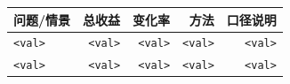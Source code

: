 \begin{tabular}{lrrrr}
\toprule
\textbf{问题/情景} & \textbf{总收益} & \textbf{变化率} & \textbf{方法} & \textbf{口径说明} \\\midrule
\texttt{<val>} & \texttt{<val>} & \texttt{<val>} & \texttt{<val>} & \texttt{<val>} \\
\texttt{<val>} & \texttt{<val>} & \texttt{<val>} & \texttt{<val>} & \texttt{<val>} \\\bottomrule
\end{tabular}

